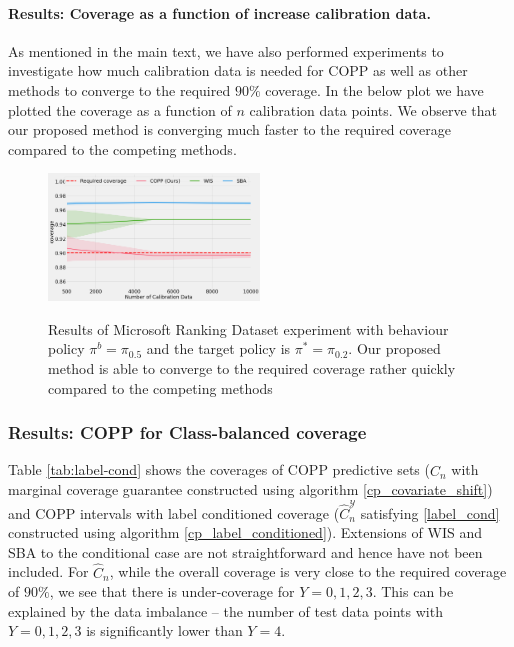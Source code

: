 \paragraph{Results: Coverage as a function of increase calibration data.}\label{app:N-cal_exp_msr}
As mentioned in the main text, we have also performed experiments to investigate how much calibration data is needed for COPP as well as other methods to converge to the required $90\%$ coverage. In the below plot we have plotted the coverage as a function of $n$ calibration data points. We observe that our proposed method is converging much faster to the required coverage compared to the competing methods.

\begin{figure}[htp!]
    \centering
    \includegraphics[width=0.5\textwidth]{figures/copp/cov-ncal-msr.png} %
    \label{fig:ncal-msr}
    \caption{Results of Microsoft Ranking Dataset experiment with behaviour policy $\pi^b = \pi_{0.5}$ and the target policy is $\pi^* = \pi_{0.2}$. Our proposed method is able to converge to the required coverage rather quickly compared to the competing methods}
    \label{fig:msr}
\end{figure}
\newpage
\subsubsection{Results: COPP for Class-balanced coverage}\label{sec:results_class_bal_coverage}

Table \ref{tab:label-cond} shows the coverages of COPP predictive sets ($\hat{C}_n$ with marginal coverage guarantee constructed using algorithm \ref{cp_covariate_shift}) and COPP intervals with label conditioned coverage ($\hat{C}^{\mathcal{Y}}_n$ satisfying \eqref{label_cond} constructed using algorithm \ref{cp_label_conditioned}). Extensions of WIS and SBA to the conditional case are not straightforward and hence have not been included. For $\hat{C}_n$, while the overall coverage is very close to the required coverage of $90\%$, we see that there is under-coverage for $Y = 0,1,2,3$. This can be explained by the data imbalance -- the number of test data points with $Y = 0,1,2,3$ is significantly lower than $Y=4$. 

